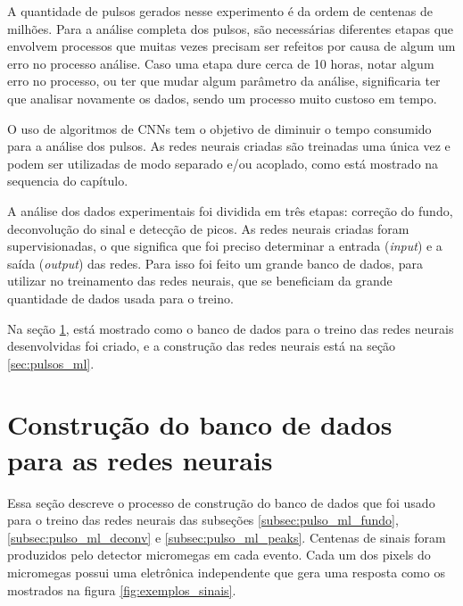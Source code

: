 \documentclass[a4paper,12pt,oneside]{book}
\begin{document}
\par A quantidade de pulsos gerados nesse experimento é da ordem de centenas de milhões. Para a análise completa dos pulsos, são necessárias diferentes etapas que envolvem processos que muitas vezes precisam ser refeitos por causa de algum um erro no processo análise. Caso uma etapa dure cerca de 10 horas, notar algum erro no processo, ou ter que mudar algum parâmetro da análise, significaria ter que analisar novamente os dados, sendo um processo muito custoso em tempo.

\par O uso de algoritmos de CNNs tem o objetivo de diminuir o tempo consumido para a análise dos pulsos. As redes neurais criadas são treinadas uma única vez e podem ser utilizadas de modo separado e/ou acoplado\cite{FORTINO2022166497}, como está mostrado na sequencia do capítulo.

\par A análise dos dados experimentais foi dividida em três etapas: correção do fundo, deconvolução do sinal e detecção de picos. As redes neurais criadas foram supervisionadas, o que significa que foi preciso determinar a entrada (\textit{input}) e a saída (\textit{output}) das redes. Para isso foi feito um grande banco de dados, para utilizar no treinamento das redes neurais, que se beneficiam da grande quantidade de dados usada para o treino\cite{mlbook}.

\par Na seção \ref{sec:pulses_trad}, está mostrado como o banco de dados para o treino das redes neurais desenvolvidas foi criado, e a construção das redes neurais está na seção \ref{sec:pulsos_ml}.






\section{Construção do banco de dados para as redes neurais}\label{sec:pulses_trad}

\par Essa seção descreve o processo de construção do banco de dados que foi usado para o treino das redes neurais das subseções \ref{subsec:pulso_ml_fundo}, \ref{subsec:pulso_ml_deconv} e \ref{subsec:pulso_ml_peaks}. Centenas de sinais foram produzidos pelo detector micromegas em cada evento. Cada um dos pixels do micromegas possui uma eletrônica independente que gera uma resposta como os mostrados na figura \ref{fig:exemplos_sinais}.
\end{document}
